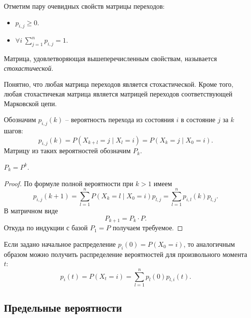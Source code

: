 \begin{remark}
    Отметим пару очевидных свойств матрицы переходов:
    \begin{itemize}
        \item $p_{i, j} \geqslant 0$.
        \item $\forall i~ \sum_{j = 1}^n{p_{i, j}} = 1$.
    \end{itemize}
\end{remark}

\begin{definition}
    Матрица, удовлетворяющая вышеперечисленным свойствам, называется
    \textit{стохастической}.
\end{definition}

\begin{remark}
    Понятно, что любая матрица переходов является стохастической. Кроме того,
    любая стохастичекая матрица является матрицей переходов соответствующей
    Марковской цепи.
\end{remark}

\begin{definition}
    Обозначим $p_{i, j}(k)$ -- вероятность перехода из состояния $i$ в состояние
    $j$ за $k$ шагов:
    \[
        p_{i, j}(k) = P(X_{k + l} = j \mid X_l = i) = P(X_k = j \mid X_0 = i)
    .\]
    Матрицу из таких вероятностей обозначим $P_k$.
\end{definition}

\begin{theorem}
    $P_k = P^k$.
\end{theorem}
\begin{proof}
    По формуле полной вероятности при $k > 1$ имеем
    \[
        p_{i, j}(k + 1) = \sum_{l = 1}^n{P(X_k = l \mid X_0 = i) p_{l, j}}
        = \sum_{l = 1}^n{p_{i, l}(k) p_{l, j}}
    .\]
    В матричном виде
    \[
        P_{k + 1} = P_{k} \cdot P
    .\]
    Откуда по индукции с базой $P_1 = P$ получаем требуемое.
\end{proof}

\begin{remark}
    Если задано начальное распределение $p_i(0) = P(X_0 = i)$, то аналогичным
    образом можно получить распределение вероятностей для произвольного момента
    $t$:
    \[
        p_i(t) = P(X_t = i) = \sum_{l = 1}^n{p_l(0) p_{l, i}(t)}
    .\]
\end{remark}

\subsection{Предельные вероятности}

